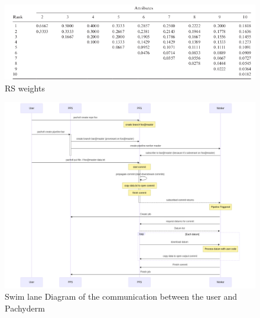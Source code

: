 \begin{figure}[H]
    \centering
    \includegraphics[width=16cm]{graphics/RS_weigts.png}
    \caption[RS weights]{RS weights \footnotemark}
    \label{abb:RS_weights}
  \end{figure}
  


\begin{figure}[H]
  \centering
  \includegraphics[width=14cm]{graphics/pipeline_communication_sld.png}
  \caption[Swim lane Diagram of the communication between the user and Pachyderm]{Swim lane Diagram of the communication between the user and Pachyderm\footnotemark}
  \label{abb:pipeline_communication_sld}
\end{figure}

\newpage



\label{appendix:minikube_installation_instructions}


